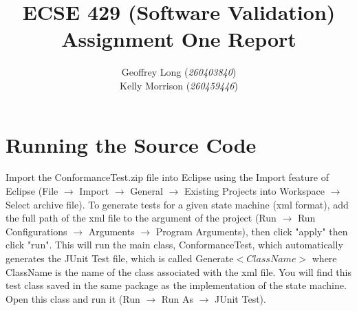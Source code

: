 \documentclass[11pt, a4paper]{article}
\title{ECSE 429 (Software Validation) \\ Assignment One Report}
\author{Geoffrey Long (\textit{260403840}) \\ Kelly Morrison (\textit{260459446})}
\begin{document}
\maketitle




\section{Running the Source Code}
Import the ConformanceTest.zip file into Eclipse using the Import feature of Eclipse (File $\rightarrow$ Import $\rightarrow$ General $\rightarrow$ Existing Projects into Workspace $\rightarrow$ Select archive file). To generate tests for a given state machine (xml format), add the full path of the xml file to the argument of the project (Run $\rightarrow$ Run Configurations $\rightarrow$ Arguments $\rightarrow$ Program Arguments), then click "apply" then click "run". This will run the main class, ConformanceTest, which automatically generates the JUnit Test file, which is called Generate$<ClassName>$ where ClassName is the name of the class associated with the xml file. You will find this test class saved in the same package as the implementation of the state machine. Open this class and run it (Run $\rightarrow$ Run As $\rightarrow$ JUnit Test). 

\end{document}
